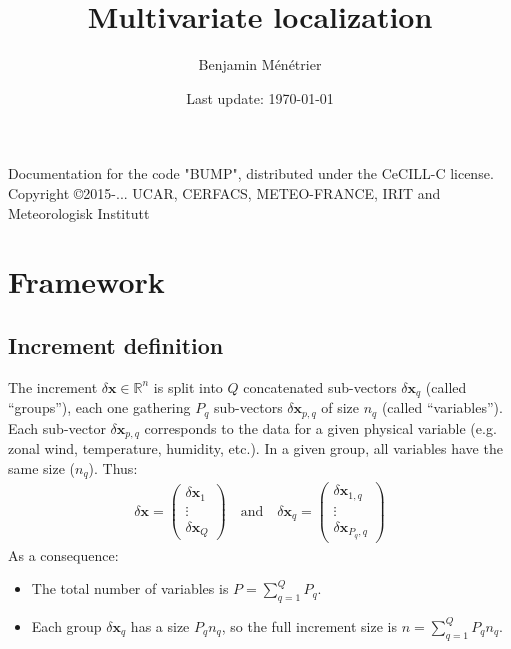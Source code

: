 \documentclass[12pt]{scrartcl}
\begin{document}
\title{Multivariate localization}
\author{Benjamin Ménétrier}
\date{Last update: \today}

\thispagestyle{empty}

\maketitle
\begin{center}
Documentation for the code "BUMP", distributed under the CeCILL-C license.\\
Copyright \copyright 2015-... UCAR, CERFACS, METEO-FRANCE, IRIT and Meteorologisk Institutt
\end{center}

\tableofcontents

\clearpage


\section{Framework}

\subsection{Increment definition}
The increment $\delta \mathbf{x} \in \mathbb{R}^n$ is split into $Q$ concatenated sub-vectors $\delta \mathbf{x}_q$ (called ``groups''), each one gathering $P_q$ sub-vectors $\delta \mathbf{x}_{p,q}$ of size $n_q$ (called ``variables''). Each sub-vector $\delta \mathbf{x}_{p,q}$ corresponds to the data for a given physical variable (e.g. zonal wind, temperature, humidity, etc.). In a given group, all variables have the same size ($n_q$). Thus:
\begin{align}
\delta \mathbf{x} = \left( \begin{array}{c}
\delta \mathbf{x}_1 \\[1ex]
\hline
\vdots \\
\hline
\delta \mathbf{x}_Q
\end{array} \right) \quad \text{and} \quad \delta \mathbf{x}_q = \left( \begin{array}{c}
\delta \mathbf{x}_{1,q} \\[1ex]
\hline
\vdots \\
\hline
\delta \mathbf{x}_{P_q,q}
\end{array} \right) 
\end{align}
As a consequence:
\begin{itemize}
\item The total number of variables is $\displaystyle P = \sum_{q=1}^Q P_q$.
\item Each group $\delta \mathbf{x}_q$ has a size $P_q n_q$, so the full increment size is $n = \displaystyle \sum_{q=1}^Q P_q n_q$.
\end{itemize}
\end{document}
